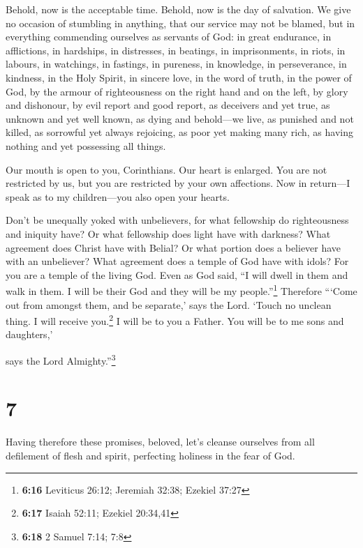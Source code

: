 Behold, now is the acceptable time. Behold, now is the day of salvation.
 We give no occasion of stumbling in anything, that our
service may not be blamed,  but in everything commending
ourselves as servants of God: in great endurance, in afflictions, in
hardships, in distresses,  in beatings, in imprisonments,
in riots, in labours, in watchings, in fastings,  in
pureness, in knowledge, in perseverance, in kindness, in the Holy
Spirit, in sincere love,  in the word of truth, in the
power of God, by the armour of righteousness on the right hand and on
the left,  by glory and dishonour, by evil report and good
report, as deceivers and yet true,  as unknown and yet
well known, as dying and behold---we live, as punished and not killed,
 as sorrowful yet always rejoicing, as poor yet making
many rich, as having nothing and yet possessing all things.

 Our mouth is open to you, Corinthians. Our heart is
enlarged.  You are not restricted by us, but you are
restricted by your own affections.  Now in return---I
speak as to my children---you also open your hearts.

 Don't be unequally yoked with unbelievers, for what
fellowship do righteousness and iniquity have? Or what fellowship does
light have with darkness?  What agreement does Christ
have with Belial? Or what portion does a believer have with an
unbeliever?  What agreement does a temple of God have
with idols? For you are a temple of the living God. Even as God said,
``I will dwell in them and walk in them. I will be their God and they
will be my people.''\footnote{\textbf{6:16} Leviticus 26:12; Jeremiah
  32:38; Ezekiel 37:27}  Therefore ```Come out from
amongst them, and be separate,' says the Lord. `Touch no unclean thing.
I will receive you.\footnote{\textbf{6:17} Isaiah 52:11; Ezekiel
  20:34,41}  I will be to you a Father. You will be to me
sons and daughters,'

says the Lord Almighty.''\footnote{\textbf{6:18} 2 Samuel 7:14; 7:8}

\hypertarget{section-6}{%
\section{7}\label{section-6}}

 Having therefore these promises, beloved, let's cleanse
ourselves from all defilement of flesh and spirit, perfecting holiness
in the fear of God.

